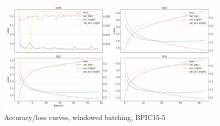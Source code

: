 \begin{figure}[!htb]
    \centering
    \includegraphics[width=\textwidth]{gfx/bpic2015_5/windowed_loss_acc_curve.pdf}
    \caption{Accuracy/loss curves, windowed batching, BPIC15-5}
\end{figure}
\FloatBarrier
